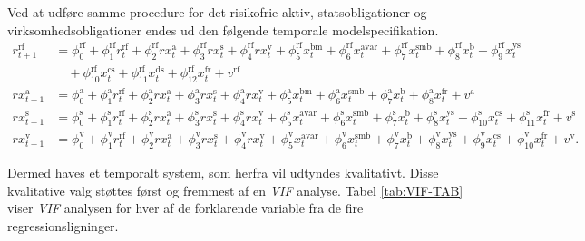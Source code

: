 \documentclass[
  a4paper,
  oneside]{memoir}
\begin{document}
Ved at udføre samme procedure for det risikofrie aktiv, statsobligationer og virksomhedsobligationer endes ud den følgende temporale modelspecifikation.
\begin{align*}
r_{t+1}^{\text{rf}}&=\phi_0^{\text{rf}} + \phi_1^{\text{rf}} r_{t}^{\text{rf}} +  \phi_2^{\text{rf}} rx_{t}^{\text{a}} + \phi_3^{\text{rf}} rx_{t}^{\text{s}} + \phi_4^{\text{rf}} rx_{t}^{\text{v}} + \phi_5^{\text{rf}} x_{t}^{\text{bm}} + \phi_6^{\text{rf}} x_{t}^{\text{avar}} + \phi_7^{\text{rf}} x_{t}^{\text{smb}} + \phi_8^{\text{rf}} x_{t}^{\text{b}} + \phi_9^{\text{rf}} x_{t}^{\text{ys}}\\
&\quad+ \phi_{10}^{\text{rf}} x_{t}^{\text{cs}}+ \phi_{11}^{\text{rf}} x_{t}^{\text{ds}} + \phi_{12}^{\text{rf}} x_{t}^{\text{fr}}+v^{\text{rf}}\\
rx_{t+1}^{\text{a}}&=\phi_0^{\text{a}} + \phi_1^{\text{a}} r_{t}^{\text{rf}} +  \phi_2^{\text{a}} rx_{t}^{\text{a}} + \phi_3^{\text{a}} rx_{t}^{\text{s}} + \phi_4^{\text{a}} rx_{t}^{\text{v}} + \phi_5^{\text{a}} x_{t}^{\text{bm}} + \phi_6^{\text{a}} x_{t}^{\text{smb}} + \phi_7^{\text{a}} x_{t}^{\text{b}} + \phi_8^{\text{a}} x_{t}^{\text{fr}}+v^{\text{a}}\\
rx_{t+1}^{\text{s}}&=\phi_0^{\text{s}} + \phi_1^{\text{s}} r_{t}^{\text{rf}} +  \phi_2^{\text{s}} rx_{t}^{\text{a}} + \phi_3^{\text{s}} rx_{t}^{\text{s}} + \phi_4^{\text{s}} rx_{t}^{\text{v}} + \phi_5^{\text{s}} x_{t}^{\text{avar}} + \phi_6^{\text{s}} x_{t}^{\text{smb}} + \phi_7^{\text{s}} x_{t}^{\text{b}} + \phi_8^{\text{s}} x_{t}^{\text{ys}}+ \phi_{10}^{\text{s}} x_{t}^{\text{cs}}+ \phi_{11}^{\text{s}} x_{t}^{\text{fr}}+v^{\text{s}}\\
rx_{t+1}^{\text{v}}&=\phi_0^{\text{v}}+ \phi_1^{\text{v}} r_{t}^{\text{rf}} +  \phi_2^{\text{v}} rx_{t}^{\text{a}} + \phi_3^{\text{v}} rx_{t}^{\text{s}} + \phi_4^{\text{v}} rx_{t}^{\text{v}} + \phi_5^{\text{v}} x_{t}^{\text{avar}} + \phi_6^{\text{v}} x_{t}^{\text{smb}} + \phi_7^{\text{v}} x_{t}^{\text{b}} + \phi_8^{\text{v}} x_{t}^{\text{ys}}+ \phi_9^{\text{v}} x_{t}^{\text{cs}} + \phi_{10}^{\text{v}} x_{t}^{\text{fr}}+v^{\text{v}}.
\end{align*}

Dermed haves et temporalt system, som herfra vil udtyndes kvalitativt. Disse kvalitative valg støttes først og fremmest af en \emph{VIF} analyse. Tabel \ref{tab:VIF-TAB} viser \emph{VIF} analysen for hver af de forklarende variable fra de fire regressionsligninger.
\end{document}

